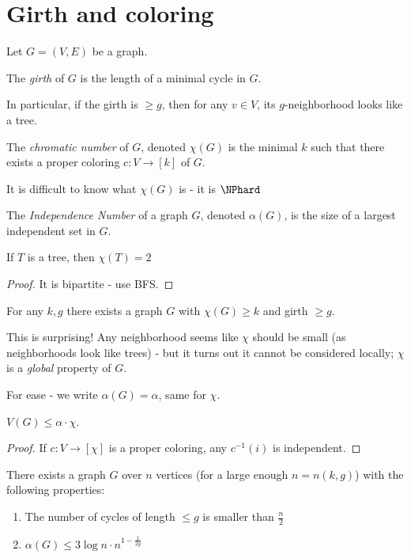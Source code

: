 \documentclass[a4paper, 11pt, oneside]{book}
\begin{document}
\section{Girth and coloring}
\begin{yellowBox}
Let $G = (V,E)$ be a graph.
\begin{defn}
	[Girth] 
	The \emph{girth} of $G$ is the length of a minimal cycle in $G$. 
\end{defn}	
\begin{remark}
	In particular, if the girth is $\ge g$, then for any $v\in V$, its $g$-neighborhood looks like a tree.
\end{remark}
\begin{defn}
	 The \emph{chromatic number } of $G$, denoted $\chi(G)$ is the minimal $k$ such that there exists a proper coloring $c:V\to [k]$ of $G$.
\end{defn}
\begin{remark}
	It is difficult to know what $\chi(G)$ is - it is $\NPhard$
\end{remark}
\begin{defn}
	 The \emph{Independence Number }of a graph $G$, denoted $\alpha(G)$, is the size of a largest independent set in $G$.
\end{defn}
\end{yellowBox}
\begin{claim}
	If $T$ is a tree, then $\chi(T) = 2$
\end{claim}
\begin{proof}
	It is bipartite - use BFS.
\end{proof}
\begin{thm}
	[Erd\H{o}s] \label{thm: High girth and chromatic}For any $k,g$ there exists a graph $G$ with $\chi(G) \ge k$ and girth $\ge g$.
\end{thm}
\begin{remark}
	This is surprising! Any neighborhood seems like $\chi$ should be small (as neighborhoods look like trees) - but it turns out it cannot be considered locally; $\chi$ is a \emph{global} property of $G$.
\end{remark}
For ease - we write $\alpha(G) = \alpha$, same for $\chi$.
\begin{lemma}
	$V(G)\le \alpha\cdot\chi$.
\end{lemma}
\begin{proof}
	If $c:V\to [\chi]$ is a proper coloring, any $c^{-1}(i)$ is independent.
\end{proof}
\begin{lemma}
	There exists a graph $G$ over $n$ vertices (for a large enough $n = n(k,g)$) with the following properties:
	\begin{enumerate}
  \item The number of cycles of length $\le g$ is smaller than $\frac{n}{2}$
  \item $\alpha(G) \le 3\log n\cdot n^{1-\frac{1}{2g}}$
\end{enumerate}
\end{lemma}
\end{document}
